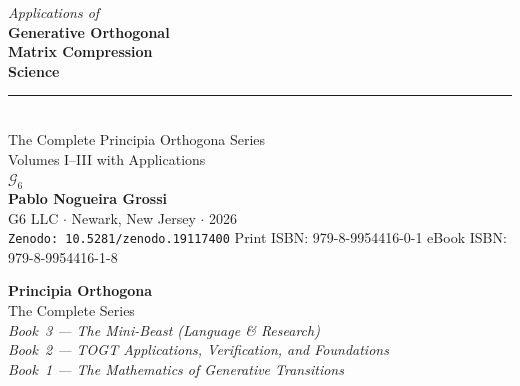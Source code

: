 \documentclass[11pt, twoside, openright]{book}
\theoremstyle{plain}
\theoremstyle{definition}
\begin{document}
\pagestyle{empty}
\begin{titlepage}
  \pagecolor{PrincipiaDark}
  \color{white}
  \vspace*{0pt}
  \begin{center}
    \vspace{2cm}
    {\small\itshape\color{PrincipiaGold} Applications of}\\[6pt]
    {\fontsize{28}{34}\selectfont\bfseries Generative Orthogonal\\[4pt]
    Matrix Compression\\[4pt]
    Science}\\[18pt]
    {\color{PrincipiaGold}\rule{3in}{0.6pt}}\\[14pt]
    {\large The Complete Principia Orthogona Series\\[4pt]
    Volumes I--III with Applications}\\[30pt]
    {\Huge $\mathcal{G}_6$}\\[30pt]
    {\large\bfseries Pablo Nogueira Grossi}\\[8pt]
    {\normalsize G6 LLC $\cdot$ Newark, New Jersey $\cdot$ 2026}\\[6pt]
    {\small\texttt{Zenodo: 10.5281/zenodo.19117400}}
    \vfill
    {\small\color{PrincipiaGold}
      Print ISBN: 979-8-9954416-0-1 \quad eBook ISBN: 979-8-9954416-1-8}
  \end{center}
\end{titlepage}
\restoregeometry
\nopagecolor
\pagestyle{fancy}

\frontmatter
\pagestyle{empty}

\begin{center}
\vspace*{3cm}
{\Large\bfseries\color{PrincipiaDark} Principia Orthogona}\\[6pt]
{\large The Complete Series}\\[30pt]
{\normalsize\itshape
Book~3 --- The Mini-Beast (Language \& Research)\\[4pt]
Book~2 --- TOGT Applications, Verification, and Foundations\\[4pt]
Book~1 --- The Mathematics of Generative Transitions
}
\end{center}
\cleardoublepage
\end{document}
